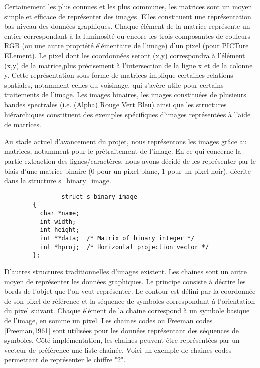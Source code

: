 \documentclass[]{report}
\begin{document}
      Certainement les plus connues et les plus communes, les matrices sont un moyen simple et efficace de représenter des images. Elles constituent une représentation bas-niveau des données graphiques. Chaque élément de la matrice représente un entier correspondant à la luminosité ou encore les trois composantes de couleurs RGB (ou une autre propriété élémentaire de l'image) d'un pixel (pour PICTure ELement). Le pixel dont les coordonnées seront (x,y) correspondra à l'élément (x,y) de la matrice,plus précisement à l'intersection de la ligne x et de la colonne y. Cette représentation sous forme de matrices implique certaines relations spatiales, notamment celles du voisinage, qui s'avère utile pour certains traitements de l'image. Les images binaires, les images constituées de plusieurs bandes spectrales (i.e. (Alpha) Rouge Vert Bleu) ainsi que les structures hiérarchiques constituent des exemples spécifiques d'images représentées à l'aide de matrices.
  

      Au stade actuel d'avancement du projet, nous représentons les images grâce au matrices, notamment pour le prétraitement de l'image. En ce qui concerne la partie extraction des lignes/caractères, nous avons décidé de les représenter par le biais d'une matrice binaire (0 pour un pixel blanc, 1 pour un pixel noir), décrite dans la structure s_binary_image.

      \begin{verbatim}
				struct s_binary_image
        {
          char *name;
          int width;
          int height;
          int **data;  /* Matrix of binary integer */
          int *hproj;  /* Horizontal projection vector */
        };
			\end{verbatim}

      D'autres structures traditionnelles d'images existent. Les chaines sont un autre moyen de représenter les données graphiques. Le principe consiste à décrire les bords de l'objet que l'on veut représenter. Le contour est défini par la coordonnée de son pixel de référence et la séquence de symboles correspondant à l'orientation du pixel suivant. Chaque élément de la chaine correspond à un symbole basique de l'image, en somme un pixel. Les chaines codes ou Freeman codes [Freeman,1961] sont utilisées pour les données représentant des séquences de symboles. Côté implémentation, les chaines peuvent être représentées par un vecteur de préférence une liste chainée. Voici un exemple de chaines codes permettant de représenter le chiffre "2".

\end{document}
